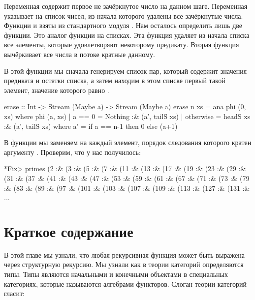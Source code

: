 Переменная  содержит первое не зачёркнутое число
на данном шаге. Переменная  указывает на список
чисел, из начала которого удалены все зачёркнутые числа.
Функции  и  взяты из 
стандартного модуля .
Нам осталось определить лишь две функции. Это аналог
функции  на списках. Эта функция удаляет 
из начала списка все элементы, которые удовлетворяют некоторому
предикату. Вторая функция  вычёркивает все 
числа в потоке кратные данному.


В этой функции мы сначала генерируем список пар, который
содержит значения предиката и остатки списка, а затем
находим в этом списке первый такой элемент, значение
которого равно . 


\begin{code}
erase :: Int -> Stream (Maybe a) -> Stream (Maybe a)
erase n xs = ana phi (0, xs)
    where phi (a, xs) 
            | a == 0    = Nothing  :& (a', tailS xs)
            | otherwise = headS xs :& (a', tailS xs)
            where a' = if a == n-1 then 0 else (a+1)
\end{code}

В функции  мы заменяем на  каждый 
элемент, порядок следования которого кратен аргументу .
Проверим, что у нас получилось:

\begin{code}
*Fix> primes 
(2 :& (3 :& (5 :& (7 :& (11 :& (13 :& (17 :& (19 :& (23 :& 
(29 :& (31 :& (37 :& (41 :& (43 :& (47 :& (53 :& (59 :& 
(61 :& (67 :& (71 :& (73 :& (79 :& (83 :& (89 :& (97 :& 
(101 :& (103 :& (107 :& (109 :& (113 :& (127 :& (131 :&
...
\end{code}

\section{Краткое содержание}

В этой главе мы узнали, что любая рекурсивная 
функция может быть выражена через структурную рекурсию.
Мы узнали как в теории категорий определяются типы. 
Типы являются начальными и конечными объектами в 
специальных категориях, которые называются алгебрами 
функторов. Слоган теории категорий гласит:

